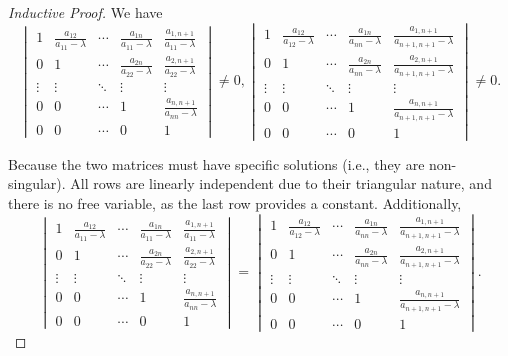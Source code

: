 \documentclass[12pt,a4paper]{article}
\begin{document}
\begin{proof}[Inductive Proof]
We have 
\[
\begin{vmatrix}
1 & \frac{a_{12}}{a_{11} - \lambda} & \cdots & \frac{a_{1n}}{a_{11} - \lambda} & \frac{a_{1,n+1}}{a_{11} - \lambda} \\
0 & 1 & \cdots & \frac{a_{2n}}{a_{22} - \lambda} & \frac{a_{2,n+1}}{a_{22} - \lambda} \\
\vdots & \vdots & \ddots & \vdots & \vdots \\
0 & 0 & \cdots & 1 & \frac{a_{n,n+1}}{a_{nn} - \lambda} \\
0 & 0 & \cdots & 0 & 1
\end{vmatrix} \neq 0, 
\begin{vmatrix}
1 & \frac{a_{12}}{a_{12} - \lambda} & \cdots & \frac{a_{1n}}{a_{nn} - \lambda} & \frac{a_{1,n+1}}{a_{{n+1,n+1}} - \lambda} \\
0 & 1 & \cdots & \frac{a_{2n}}{a_{nn} - \lambda} & \frac{a_{2,n+1}}{a_{{n+1,n+1}} - \lambda} \\
\vdots & \vdots & \ddots & \vdots & \vdots \\
0 & 0 & \cdots & 1 & \frac{a_{n,n+1}}{a_{n+1,n+1} - \lambda} \\
0 & 0 & \cdots & 0 & 1
\end{vmatrix} \neq 0.
\]

Because the two matrices must have specific solutions (i.e., they are non-singular). All rows are linearly independent due to their triangular nature, and there is no free variable, as the last row provides a constant. Additionally,
\[
\begin{vmatrix}
1 & \frac{a_{12}}{a_{11} - \lambda} & \cdots & \frac{a_{1n}}{a_{11} - \lambda} & \frac{a_{1,n+1}}{a_{11} - \lambda} \\
0 & 1 & \cdots & \frac{a_{2n}}{a_{22} - \lambda} & \frac{a_{2,n+1}}{a_{22} - \lambda} \\
\vdots & \vdots & \ddots & \vdots & \vdots \\
0 & 0 & \cdots & 1 & \frac{a_{n,n+1}}{a_{nn} - \lambda} \\
0 & 0 & \cdots & 0 & 1
\end{vmatrix} = 
\begin{vmatrix}
1 & \frac{a_{12}}{a_{12} - \lambda} & \cdots & \frac{a_{1n}}{a_{nn} - \lambda} & \frac{a_{1,n+1}}{a_{{n+1,n+1}} - \lambda} \\
0 & 1 & \cdots & \frac{a_{2n}}{a_{nn} - \lambda} & \frac{a_{2,n+1}}{a_{{n+1,n+1}} - \lambda} \\
\vdots & \vdots & \ddots & \vdots & \vdots \\
0 & 0 & \cdots & 1 & \frac{a_{n,n+1}}{a_{n+1,n+1} - \lambda} \\
0 & 0 & \cdots & 0 & 1
\end{vmatrix}.
\]


\end{proof}
\end{document}
